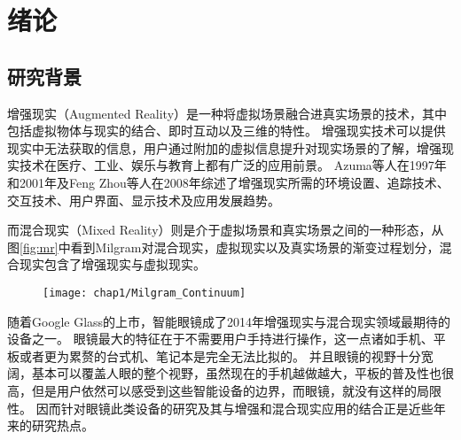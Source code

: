 
\chapter{绪论}
\label{chap:what}

\section{研究背景}


增强现实（Augmented Reality）是一种将虚拟场景融合进真实场景的技术，其中包括虚拟物体与现实的结合、即时互动以及三维的特性。
增强现实技术可以提供现实中无法获取的信息，用户通过附加的虚拟信息提升对现实场景的了解，增强现实技术在医疗、工业、娱乐与教育上都有广泛的应用前景。
Azuma等人在1997年和2001年及Feng Zhou等人在2008年综述了增强现实所需的环境设置、追踪技术、交互技术、用户界面、显示技术及应用发展趋势。

而混合现实（Mixed Reality）则是介于虚拟场景和真实场景之间的一种形态，从图\ref{fig:mr}中看到Milgram对混合现实，虚拟现实以及真实场景的渐变过程划分，混合现实包含了增强现实与虚拟现实。

\begin{figure}[!htp]
  \centering
  \texttt{[image: chap1/Milgram\_Continuum]}
\end{figure}

随着Google Glass的上市，智能眼镜成了2014年增强现实与混合现实领域最期待的设备之一。
眼镜最大的特征在于不需要用户手持进行操作，这一点诸如手机、平板或者更为累赘的台式机、笔记本是完全无法比拟的。
并且眼镜的视野十分宽阔，基本可以覆盖人眼的整个视野，虽然现在的手机越做越大，平板的普及性也很高，但是用户依然可以感受到这些智能设备的边界，而眼镜，就没有这样的局限性。
因而针对眼镜此类设备的研究及其与增强和混合现实应用的结合正是近些年来的研究热点。

